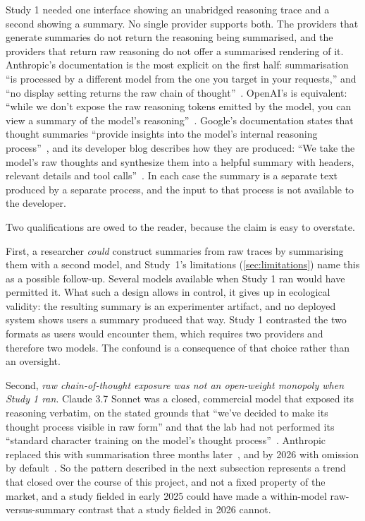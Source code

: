 \documentclass[manuscript,review,anonymous]{acmart}
\begin{document}
Study 1 needed one interface showing an unabridged reasoning trace and a second showing a summary. No single provider supports both. The providers that generate
summaries do not return the reasoning being summarised, and the providers that return raw reasoning do not offer a summarised rendering of it. Anthropic's
documentation is the most explicit on the first half: summarisation ``is
processed by a different model from the one you target in your requests,'' and ``no display setting returns the raw chain of thought''~\cite{anthropic2026thinking}. OpenAI's is equivalent: ``while we don't
expose the raw reasoning tokens emitted by the model, you can view a summary of
the model's reasoning''~\cite{openai2025reasoningapi}. 
Google's documentation states that thought summaries ``provide insights into the model's internal
reasoning process''~\cite{google2025thinking}, and its developer blog describes how they are produced: ``We take the model's raw thoughts and synthesize them into a helpful summary with headers, relevant details and tool calls''~\cite{google2025thoughtsummaries}.
In each case
the summary is a separate text produced by a separate process, and the input to
that process is not available to the developer.

Two qualifications are owed to the reader, because the claim is easy to overstate.

First, a researcher \emph{could} construct summaries from raw traces by
summarising them with a second model, and Study~1's limitations
(\autoref{sec:limitations}) name this as a possible follow-up. Several models available when Study 1 ran would have permitted it. What such a design
allows in control, it gives up in ecological validity: the resulting summary is an
experimenter artifact, and no deployed system shows users a summary produced that way. Study 1 contrasted the two formats as users would encounter them, which
requires two providers and therefore two models. The confound is a consequence of that choice rather than an oversight.

Second, \emph{raw chain-of-thought
exposure was not an open-weight monopoly when Study 1 ran}. Claude 3.7 Sonnet was
a closed, commercial model that exposed its reasoning verbatim, on the stated
grounds that ``we've decided to make its thought process visible in raw form''
and that the lab had not performed its ``standard character training on the
model's thought process''~\cite{anthropic2025extended}. Anthropic replaced this
with summarisation three months later~\cite{anthropic2025claude4}, and by 2026
with omission by default~\cite{anthropic2026thinking}. So the pattern described in the next subsection represents a
trend that closed over the course of this project, and not a fixed property of the market, and a study fielded in early 2025 could have made a within-model
raw-versus-summary contrast that a study fielded in 2026 cannot.
\end{document}
